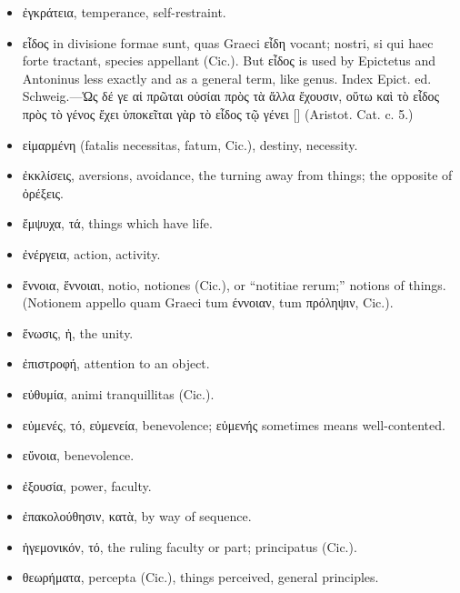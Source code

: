 \begin{itemize}[leftmargin=*]
\setlength\itemsep{0em}
\item
  \textgreek{ἐγκράτεια}, temperance, self-restraint.
\item
  \textgreek{εἶδος} in divisione formae sunt, quas Graeci \textgreek{εἶδη} vocant; nostri, si
  qui haec forte tractant, species appellant (Cic.). But \textgreek{εἶδος} is used
  by Epictetus and Antoninus less exactly and as a general term, like
  genus. Index Epict. ed. Schweig.---\textgreek{Ὡς δέ γε αἱ πρῶται οὐσίαι πρὸς τὰ
  ἄλλα ἔχουσιν, οὕτω καὶ τὸ εἶδος πρὸς τὸ γένος ἔχει ὑποκεῖται γὰρ τὸ
  εἶδος τῷ γένει} [] (Aristot. Cat. c. 5.)
\item
  \textgreek{εἰμαρμένη} (fatalis necessitas, fatum, Cic.), destiny, necessity.
\item
  \textgreek{ἐκκλίσεις}, aversions, avoidance, the turning away from things; the
  opposite of \textgreek{ὀρέξεις}.
\item
  \textgreek{ἔμψυχα, τά}, things which have life.
\item
  \textgreek{ἐνέργεια}, action, activity.
\item
  \textgreek{ἕννοια, ἕννοιαι}, notio, notiones (Cic.), or ``notitiae rerum;''
  notions of things. (Notionem appello quam Graeci tum \textgreek{έννοιαν}, tum
  \textgreek{πρόληψιν}, Cic.).
\item
  \textgreek{ἕνωσις, ἡ}, the unity.
\item
  \textgreek{ἐπιστροφή}, attention to an object.
\item
  \textgreek{εὐθυμία}, animi tranquillitas (Cic.).
\item
  \textgreek{εὐμενές, τό, εὐμενεία}, benevolence; \textgreek{εὐμενής} sometimes means
  well-contented.
\item
  \textgreek{εὔνοια}, benevolence.
\item
  \textgreek{ἐξουσία}, power, faculty.
\item
  \textgreek{ἐπακολούθησιν, κατὰ}, by way of sequence.
\end{itemize}

\begin{itemize}[leftmargin=*]
\setlength\itemsep{0em}
\item
  \textgreek{ἡγεμονικόν, τό}, the ruling faculty or part; principatus (Cic.).
\end{itemize}

\begin{itemize}[leftmargin=*]
\setlength\itemsep{0em}
\item
  \textgreek{θεωρήματα}, percepta (Cic.), things perceived, general principles.
\end{itemize}

